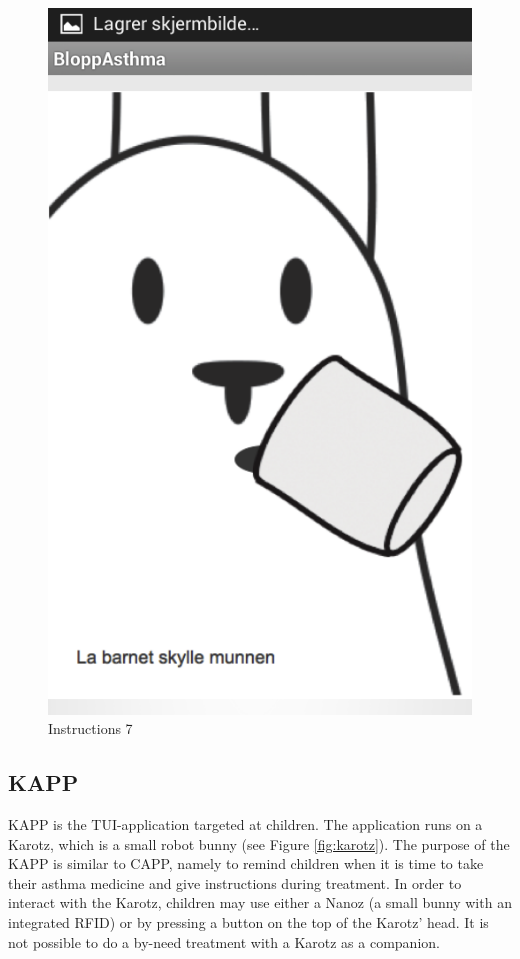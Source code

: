 \begin{figure}[H]
	\begin{minipage}[b]{0.3\linewidth}
		\centering
		\includegraphics[width=0.20\paperwidth]{Pictures/app-screenshots/instructions-7.png}
		\caption{Instructions 7}
		\label{fig:instructions-7}
	\end{minipage}
\end{figure}


\subsection{KAPP}
\label{sec:description-kapp}
KAPP is the TUI-application targeted at children. The application runs on a Karotz\cite{karotz}, which is a small robot bunny (see Figure \ref{fig:karotz}). The purpose of the KAPP is similar to CAPP, namely to remind children when it is time to take their asthma medicine and give instructions during treatment. In order to interact with the Karotz, children may use either a Nanoz (a small bunny with an integrated RFID) or by pressing a button on the top of the Karotz' head. It is not possible to do a by-need treatment with a Karotz as a companion. 

